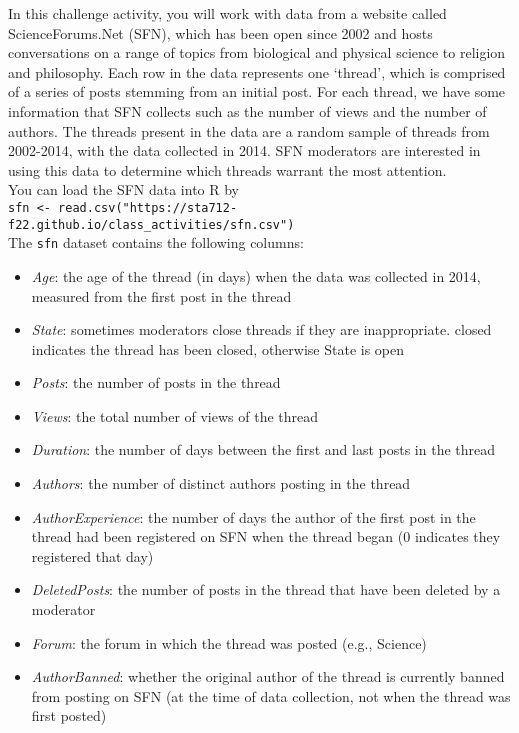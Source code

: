 \documentclass[11pt]{article}
\begin{document}
In this challenge activity, you will work with data from a website called ScienceForums.Net (SFN), which has been open since 2002 and hosts conversations on a range of topics from biological and physical science to religion and philosophy. Each row in the data represents one ‘thread’, which is comprised of a series of posts stemming from an initial post. For each thread, we have some information that SFN collects such as the number of views and the number of authors. The threads present in the data are a random sample of threads from 2002-2014, with the data collected in 2014. SFN moderators are interested in using this data to determine which threads warrant the most attention.\\

\noindent You can load the SFN data into R by\\

\verb;sfn <- read.csv("https://sta712-f22.github.io/class_activities/sfn.csv");\\


\noindent The \texttt{sfn} dataset contains the following columns:

\begin{itemize}
\item \textit{Age}: the age of the thread (in days) when the data was collected in 2014, measured from the first post in the thread
\item \textit{State}: sometimes moderators close threads if they are inappropriate. closed indicates the thread has been closed, otherwise State is open
\item \textit{Posts}: the number of posts in the thread
\item \textit{Views}: the total number of views of the thread
\item \textit{Duration}: the number of days between the first and last posts in the thread
\item \textit{Authors}: the number of distinct authors posting in the thread
\item \textit{AuthorExperience}: the number of days the author of the first post in the thread had been registered on SFN when the thread began (0 indicates they registered that day)
\item \textit{DeletedPosts}: the number of posts in the thread that have been deleted by a moderator
\item \textit{Forum}: the forum in which the thread was posted (e.g., Science)
\item \textit{AuthorBanned}: whether the original author of the thread is currently banned from posting on SFN (at the time of data collection, not when the thread was first posted)
\end{itemize}
\end{document}
